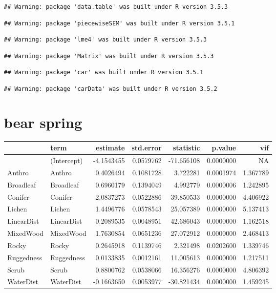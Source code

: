 \documentclass[]{article}
\title{}
\author{}
\date{}
\begin{document}
\clearpage

\begin{verbatim}
## Warning: package 'data.table' was built under R version 3.5.3
\end{verbatim}

\begin{verbatim}
## Warning: package 'piecewiseSEM' was built under R version 3.5.1
\end{verbatim}

\begin{verbatim}
## Warning: package 'lme4' was built under R version 3.5.3
\end{verbatim}

\begin{verbatim}
## Warning: package 'Matrix' was built under R version 3.5.3
\end{verbatim}

\begin{verbatim}
## Warning: package 'car' was built under R version 3.5.1
\end{verbatim}

\begin{verbatim}
## Warning: package 'carData' was built under R version 3.5.2
\end{verbatim}

\section{bear spring}\label{bear-spring}

\begin{tabular}{llrrrrr}
\toprule
  & term & estimate & std.error & statistic & p.value & vif\\
\midrule
 & (Intercept) & -4.1543455 & 0.0579762 & -71.656108 & 0.0000000 & NA\\
Anthro & Anthro & 0.4026494 & 0.1081728 & 3.722281 & 0.0001974 & 1.367789\\
Broadleaf & Broadleaf & 0.6960179 & 0.1394049 & 4.992779 & 0.0000006 & 1.242895\\
Conifer & Conifer & 2.0837273 & 0.0522886 & 39.850533 & 0.0000000 & 4.406922\\
Lichen & Lichen & 1.4496776 & 0.0578543 & 25.057389 & 0.0000000 & 5.137413\\
LinearDist & LinearDist & 0.2089535 & 0.0048951 & 42.686043 & 0.0000000 & 1.162518\\
MixedWood & MixedWood & 1.7630854 & 0.0651236 & 27.072912 & 0.0000000 & 2.468413\\
Rocky & Rocky & 0.2645918 & 0.1139746 & 2.321498 & 0.0202600 & 1.339746\\
Ruggedness & Ruggedness & 0.0133835 & 0.0012161 & 11.005613 & 0.0000000 & 1.217511\\
Scrub & Scrub & 0.8800762 & 0.0538066 & 16.356276 & 0.0000000 & 4.806392\\
WaterDist & WaterDist & -0.1663650 & 0.0053977 & -30.821434 & 0.0000000 & 1.459245\\
\bottomrule
\end{tabular}
\end{document}
